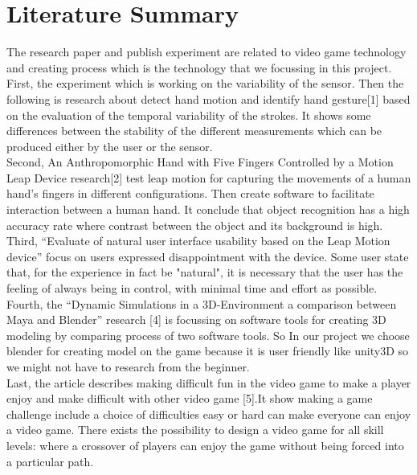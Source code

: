 \documentclass[journal]{IEEEtran}										    %
\begin{document}
        
    \section{Literature Summary}                                            %

    The research paper and publish experiment are related to video game 
    technology and creating process which is the technology that we 
    focussing in this project. \\

    First, the experiment which is working 
    on the variability of the sensor. Then the following is research 
    about detect hand motion and identify hand gesture[1] based on 
    the evaluation of the temporal variability of the strokes. It 
    shows some differences between the stability of the different 
    measurements which can be produced either by the user or the 
    sensor. \\

    Second, An Anthropomorphic Hand with Five Fingers 
    Controlled by a Motion Leap Device research[2] test leap motion 
    for capturing the movements of a human hand's fingers in different 
    configurations. Then create software to facilitate interaction 
    between a human hand. It conclude that object recognition has 
    a high accuracy rate where contrast between the object and its 
    background is high. \\
    
    Third, “Evaluate of natural user interface 
    usability based on the Leap Motion device” focus on users expressed 
    disappointment with the device. Some user state that, for the 
    experience in fact be "natural", it is necessary that the user has 
    the feeling of always being in control, with minimal time and 
    effort as possible. \\
    
    Fourth, the “Dynamic Simulations in a 3D-Environment 
    a comparison between Maya and Blender” research [4] is focussing on 
    software tools for creating 3D modeling by comparing process of two 
    software tools. So In our project we choose blender for creating model 
    on the game because it is user friendly like unity3D so we might not have 
    to research from the beginner. \\
    
    Last, the article describes making 
    difficult fun in the video game to make a player enjoy and make difficult 
    with other video game [5].It show making a game challenge include a choice 
    of difficulties easy or hard can make everyone can enjoy a video game. 
    There exists the possibility to design a video game for all skill 
    levels: where a crossover of players can enjoy the game without 
    being forced into a particular path.
\end{document}
